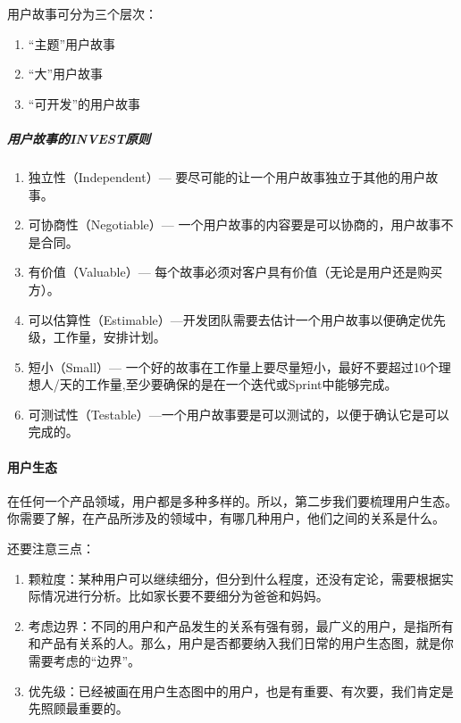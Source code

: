 \documentclass[letterpaper,11pt,english]{sphinxmanual}
\begin{document}
用户故事可分为三个层次：
\begin{enumerate}
%
\item {} 
“主题”用户故事

\item {} 
“大”用户故事

\item {} 
“可开发”的用户故事

\end{enumerate}


\subparagraph{用户故事的INVEST原则}
\label{\detokenize{chapter_skill/users_analysis:invest}}\begin{enumerate}
%
\item {} 
独立性（Independent）— 要尽可能的让一个用户故事独立于其他的用户故事。

\item {} 
可协商性（Negotiable）—
一个用户故事的内容要是可以协商的，用户故事不是合同。

\item {} 
有价值（Valuable）—
每个故事必须对客户具有价值（无论是用户还是购买方）。

\item {} 
可以估算性（Estimable）—开发团队需要去估计一个用户故事以便确定优先级，工作量，安排计划。

\item {} 
短小（Small）—
一个好的故事在工作量上要尽量短小，最好不要超过10个理想人/天的工作量,至少要确保的是在一个迭代或Sprint中能够完成。

\item {} 
可测试性（Testable）—一个用户故事要是可以测试的，以便于确认它是可以完成的。

\end{enumerate}


\paragraph{用户生态}
\label{\detokenize{chapter_skill/users_analysis:id7}}
在任何一个产品领域，用户都是多种多样的。所以，第二步我们要梳理用户生态。你需要了解，在产品所涉及的领域中，有哪几种用户，他们之间的关系是什么。

还要注意三点：
\begin{enumerate}
%
\item {} 
颗粒度：某种用户可以继续细分，但分到什么程度，还没有定论，需要根据实际情况进行分析。比如家长要不要细分为爸爸和妈妈。

\item {} 
考虑边界：不同的用户和产品发生的关系有强有弱，最广义的用户，是指所有和产品有关系的人。那么，用户是否都要纳入我们日常的用户生态图，就是你需要考虑的“边界”。

\item {} 
优先级：已经被画在用户生态图中的用户，也是有重要、有次要，我们肯定是先照顾最重要的。

\end{enumerate}
\end{document}
